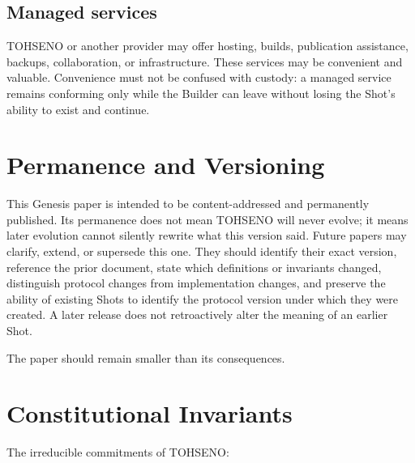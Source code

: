 \documentclass[11pt]{article}
\newcommand{\TOH}{TOHSENO}
\begin{document}
\subsection{Managed services}

\TOH{} or another provider may offer hosting, builds, publication
assistance, backups, collaboration, or infrastructure. These services
may be convenient and valuable. Convenience must not be confused with
custody: a managed service remains conforming only while the Builder can
leave without losing the Shot's ability to exist and continue.

\section{Permanence and Versioning}

This Genesis paper is intended to be content-addressed and permanently
published. Its permanence does not mean \TOH{} will never evolve; it
means later evolution cannot silently rewrite what this version said.
Future papers may clarify, extend, or supersede this one. They should
identify their exact version, reference the prior document, state which
definitions or invariants changed, distinguish protocol changes from
implementation changes, and preserve the ability of existing Shots to
identify the protocol version under which they were created. A later
release does not retroactively alter the meaning of an earlier Shot.

The paper should remain smaller than its consequences.

\section{Constitutional Invariants}

The irreducible commitments of \TOH{}:
\end{document}
